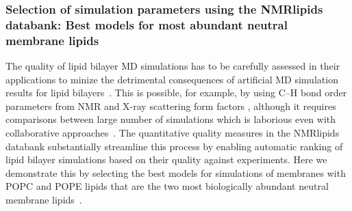 \documentclass[fleqn,10pt]{wlscirep}
\begin{document}
\subsubsection{Selection of simulation parameters using the NMRlipids databank: Best models for most abundant neutral membrane lipids}
%
%
%
The quality of lipid bilayer MD simulations has to be carefully assessed in their applications to minize the detrimental consequences of artificial MD simulation results for lipid bilayers~\cite{antila22b}. This is possible, for example, by using C--H bond order parameters from NMR and X-ray scattering form factors \cite{ollila16}, although it requires comparisons between large number of simulations which is laborious even with collaborative approaches~\cite{botan15,catte16,antila19,bacle21}. The quantitative quality measures in the NMRlipids databank substantially streamline this process by enabling automatic ranking of lipid bilayer simulations based on their quality against experiments. Here we demonstrate this by selecting the best models for simulations of membranes with POPC and POPE lipids that are the two most biologically abundant neutral membrane lipids~\cite{vanmeer08}.
\end{document}
